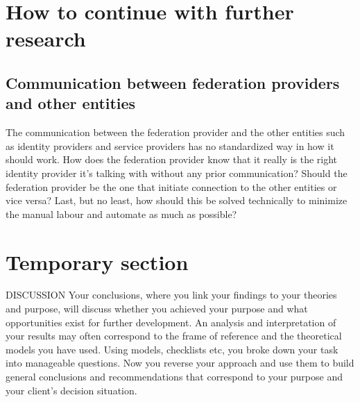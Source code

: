 \section{How to continue with further research}
\subsection{Communication between federation providers and other entities}
The communication between the federation provider and the other entities such as identity providers and service providers has no standardized way in how it should work.
How does the federation provider know that it really is the right identity provider it's talking with without any prior communication?
Should the federation provider be the one that initiate connection to the other entities or vice versa?
Last, but no least, how should this be solved technically to minimize the manual labour and automate as much as possible?

\section{Temporary section }
DISCUSSION Your conclusions, where you link your findings to your theories and purpose,
will discuss whether you achieved your purpose and what opportunities exist for further
development. An analysis and interpretation of your results may often correspond to the
frame of reference and the theoretical models you have used. Using models, checklists etc,
you broke down your task into manageable questions. Now you reverse your approach and
use them to build general conclusions and recommendations that correspond to your
purpose and your client's decision situation.

